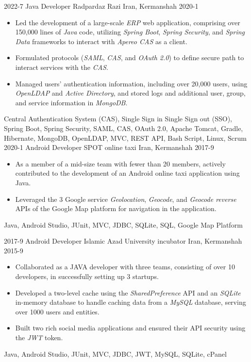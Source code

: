 \begin{experiences}
\experience
{2022-7}
{Java Developer}
{Radpardaz Razi}
{Iran, Kermanshah}
{2020-1}
{
\begin{itemize}
\item  Led the development of a large-scale \textit{ERP} web application, comprising over 150,000 lines of \emph{Java} code, utilizing \emph{Spring Boot}, \emph{Spring Security}, and \emph{Spring Data} frameworks to interact with \emph{Apereo CAS} as a client.
\item Formulated protocols (\emph{SAML}, \emph{CAS}, and \emph{OAuth 2.0}) to define secure path to interact services with the \textit{CAS}.
\item Managed users' authentication information, including over 20,000 users, using \emph{OpenLDAP} and \emph{Active Directory}, and stored logs and additional user, group, and service information in \emph{MongoDB}.
\end{itemize}
}
{Central Authentication System (CAS), Single Sign in Single Sign out (SSO), Spring Boot, Spring Security, SAML, CAS, OAuth 2.0, Apache Tomcat, Gradle, Hibernate, MongoDB, OpenLDAP, MVC, REST API, Bash Script, Linux, Scrum}
\emptySeparator
\experience
  {2020-1}
  {Android Developer}
  {SPOT online taxi}
  {Iran, Kermanshah}
  {2017-9}
  {
  \begin{itemize}
    \item As a member of a mid-size team with fewer than 20 members, actively contributed to the development of an Android online taxi application using Java.
    \item Leveraged the 3 Google service \emph{Geolocation}, \emph{Geocode}, and \emph{Geocode reverse} APIs of the Google Map platform for navigation in the application.
  \end{itemize}
  }
  {Java, Android Studio, JUnit, MVC, JDBC, SQLite, SQL, Google Map Platform}

\emptySeparator

\experience
{2017-9}
{Android Developer}
{Islamic Azad University incubator}
{Iran, Kermanshah}
{2015-9}
{
\begin{itemize}
\item Collaborated as a JAVA developer with three teams, consisting of over 10 developers, in successfully setting up 3 startups.
\item Developed a two-level cache using the \emph{SharedPreference} API and an \emph{SQLite} in-memory database to handle caching data from a \emph{MySQL} database, serving over 1000 users and entities.
\item Built two rich social media applications and ensured their API security using the \emph{JWT} token.
\end{itemize}
}
{Java, Android Studio, JUnit, MVC, JDBC, JWT, MySQL, SQLite, cPanel}

\emptySeparator
\end{experiences}